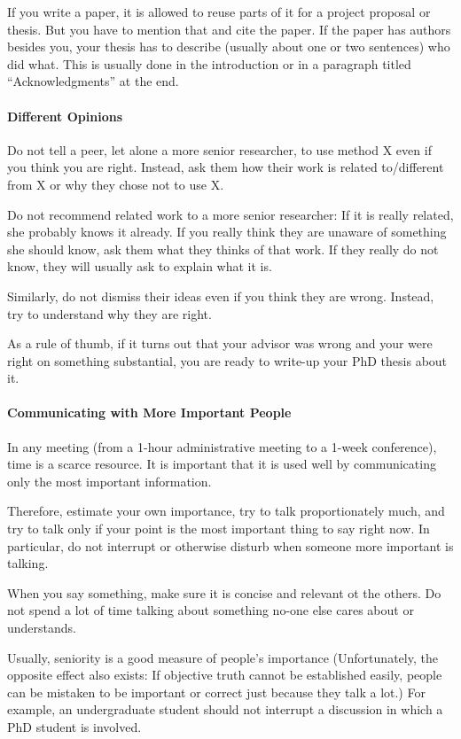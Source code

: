 \documentclass[12pt]{article}
\begin{document}
If you write a paper, it is allowed to reuse parts of it for a project proposal or thesis.
But you have to mention that and cite the paper.
If the paper has authors besides you, your thesis has to describe (usually about one or two sentences) who did what.
This is usually done in the introduction or in a paragraph titled ``Acknowledgments'' at the end.

\paragraph{Different Opinions}
Do not tell a peer, let alone a more senior researcher, to use method X even if you think you are right.
Instead, ask them how their work is related to/different from X or why they chose not to use X.

Do not recommend related work to a more senior researcher: If it is really related, she probably knows it already.
If you really think they are unaware of something she should know, ask them what they thinks of that work.
If they really do not know, they will usually ask to explain what it is.

Similarly, do not dismiss their ideas even if you think they are wrong.
Instead, try to understand why they are right.

As a rule of thumb, if it turns out that your advisor was wrong and your were right on something substantial, you are ready to write-up your PhD thesis about it.

\paragraph{Communicating with More Important People}
In any meeting (from a 1-hour administrative meeting to a 1-week conference), time is a scarce resource.
It is important that it is used well by communicating only the most important information.

Therefore, estimate your own importance, try to talk proportionately much, and try to talk only if your point is the most important thing to say right now.
In particular, do not interrupt or otherwise disturb when someone more important is talking.

When you say something, make sure it is concise and relevant ot the others.
Do not spend a lot of time talking about something no-one else cares about or understands.
\medskip

Usually, seniority is a good measure of people's importance
(Unfortunately, the opposite effect also exists: If objective truth cannot be established easily, people can be mistaken to be important or correct just because they talk a lot.)
For example, an undergraduate student should not interrupt a discussion in which a PhD student is involved.
\medskip
\end{document}
